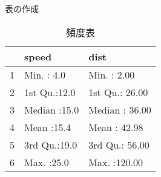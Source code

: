 \documentclass{jsarticle}
\begin{document}
表の作成
\begin{center}
\begin{table}[ht]
\centering
\begin{tabular}{rll}
  \hline
 &     speed &      dist \\ 
  \hline
1 & Min.   : 4.0   & Min.   :  2.00   \\ 
  2 & 1st Qu.:12.0   & 1st Qu.: 26.00   \\ 
  3 & Median :15.0   & Median : 36.00   \\ 
  4 & Mean   :15.4   & Mean   : 42.98   \\ 
  5 & 3rd Qu.:19.0   & 3rd Qu.: 56.00   \\ 
  6 & Max.   :25.0   & Max.   :120.00   \\ 
   \hline
\end{tabular}
\caption{頻度表} 
\label{table1}
\end{table}\end{center}
\end{document}

